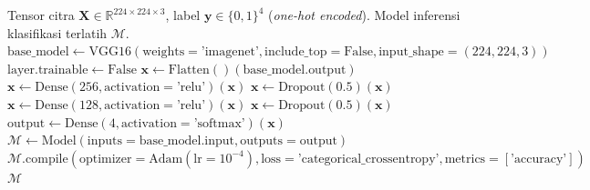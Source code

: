 \documentclass[10pt,a4paper]{article}
\begin{document}
\begin{algorithm}[htbp]
\caption{Konstruksi dan Kompilasi Model VGG16 Transfer Learning}
\label{alg:vgg16_model}
\fontsize{8.5pt}{10.5pt}\selectfont
\begin{algorithmic}[1]
\Require Tensor citra $\mathbf{X} \in \mathbb{R}^{224 \times 224 \times 3}$, label $\mathbf{y} \in \{0, 1\}^4$ (\textit{one-hot encoded}).
\Ensure Model inferensi klasifikasi terlatih $\mathcal{M}$.
\State $\text{base\_model} \gets \text{VGG16}(\text{weights}=\text{'imagenet'}, \text{include\_top}=\text{False}, \text{input\_shape}=(224, 224, 3))$
  \State $\text{layer}.\text{trainable} \gets \text{False}$ 
\EndFor
\State $\mathbf{x} \gets \text{Flatten}()(\text{base\_model}.\text{output})$
\State $\mathbf{x} \gets \text{Dense}(256, \text{activation}=\text{'relu'})(\mathbf{x})$
\State $\mathbf{x} \gets \text{Dropout}(0.5)(\mathbf{x})$
\State $\mathbf{x} \gets \text{Dense}(128, \text{activation}=\text{'relu'})(\mathbf{x})$
\State $\mathbf{x} \gets \text{Dropout}(0.5)(\mathbf{x})$
\State $\text{output} \gets \text{Dense}(4, \text{activation}=\text{'softmax'})(\mathbf{x})$
\State $\mathcal{M} \gets \text{Model}(\text{inputs}=\text{base\_model}.\text{input}, \text{outputs}=\text{output})$
\State $\mathcal{M}.\text{compile}(\text{optimizer}=\text{Adam}(\text{lr}=10^{-4}), \text{loss}=\text{'categorical\_crossentropy'}, \text{metrics}=[\text{'accuracy'}])$
\State \Return $\mathcal{M}$
\end{algorithmic}
\end{algorithm}
\end{document}
